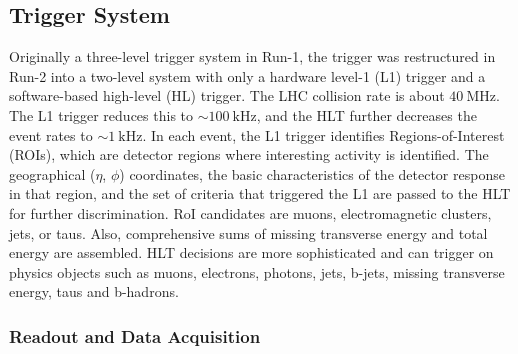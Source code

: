 \iffalse
\subsection{Trigger and DAQ}
\textcolor{blue}{Timing and  trigger control logic, the TDAQ system is complex computing system to acquire and store data.  It is partitioned into sub-systems that are typically affiliated with with sub-detectors that have the same logic components and building blocks.}  \fi
\subsection{Trigger System}
Originally a three-level trigger system in Run-1, the trigger was restructured in Run-2 into a two-level system with only a hardware level-1 (L1) trigger and a software-based high-level (HL) trigger.  The LHC collision rate is about $40~\mathrm{MHz}$.  The L1 trigger reduces this to $\sim100~\mathrm{kHz}$, and the HLT further decreases the event rates to $\sim1~\mathrm{kHz}$.  In each event, the L1 trigger identifies Regions-of-Interest (ROIs), which are detector regions where interesting activity is identified. The geographical ($\eta$, $\phi$) coordinates, the basic characteristics of the detector response in that region, and the set of criteria that triggered the L1 are passed to the HLT for further discrimination.  RoI candidates are muons, electromagnetic clusters, jets, or taus.  Also, comprehensive sums of missing transverse energy and total energy are assembled.  HLT decisions are more sophisticated and can trigger on physics objects such as muons, electrons, photons, jets, b-jets, missing transverse energy, taus and b-hadrons.  


\iffalse
\subsubsection{Readout and Data Acquisition}

